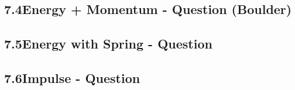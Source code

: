 \documentclass{article}
\begin{document}
\begin{adjustwidth}{1cm}{0pt}
    \subsection*{7.4\hspace*{0.5cm}Energy + Momentum - Question (Boulder)}


    \subsection*{7.5\hspace*{0.5cm}Energy with Spring - Question}


    \subsection*{7.6\hspace*{0.5cm}Impulse - Question}



\end{adjustwidth}


\end{document}

